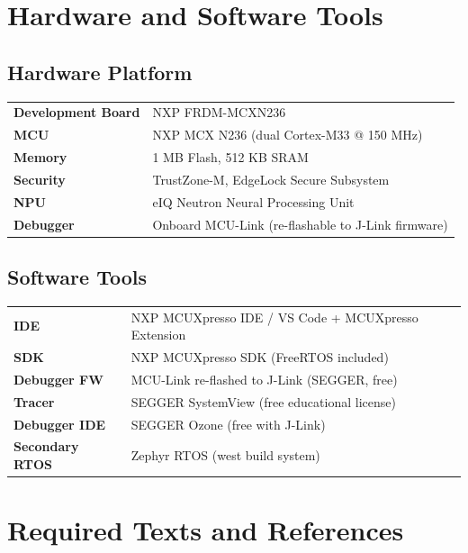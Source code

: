 \documentclass[12pt, a4paper]{article}
\begin{document}
\section{Hardware and Software Tools}

\subsection{Hardware Platform}
\begin{tabular}{@{}p{4cm} p{9cm}@{}}
  \textbf{Development Board} & NXP FRDM-MCXN236 \\
  \textbf{MCU}               & NXP MCX N236 (dual Cortex-M33 @ 150 MHz) \\
  \textbf{Memory}            & 1 MB Flash, 512 KB SRAM \\
  \textbf{Security}          & TrustZone-M, EdgeLock Secure Subsystem \\
  \textbf{NPU}               & eIQ Neutron Neural Processing Unit \\
  \textbf{Debugger}          & Onboard MCU-Link (re-flashable to J-Link firmware) \\
\end{tabular}

\subsection{Software Tools}
\begin{tabular}{@{}p{4cm} p{9cm}@{}}
  \textbf{IDE}              & NXP MCUXpresso IDE / VS Code + MCUXpresso Extension \\
  \textbf{SDK}              & NXP MCUXpresso SDK (FreeRTOS included) \\
  \textbf{Debugger FW}      & MCU-Link re-flashed to J-Link (SEGGER, free) \\
  \textbf{Tracer}           & SEGGER SystemView (free educational license) \\
  \textbf{Debugger IDE}     & SEGGER Ozone (free with J-Link) \\
  \textbf{Secondary RTOS}   & Zephyr RTOS (west build system) \\
\end{tabular}

\section{Required Texts and References}
\end{document}
